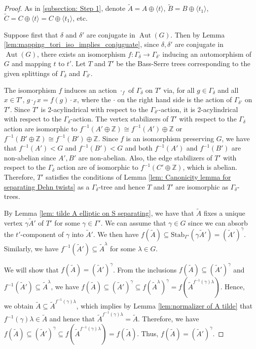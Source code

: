 \documentclass{amsart}
\newcommand{\Z}{\mathbb{Z}}
\DeclareMathOperator{\Aut}{Aut}
\theoremstyle{plain}
\theoremstyle{definition}
\theoremstyle{remark}
\begin{document}
\begin{proof}
    As in \ref{subsection: Step 1}, denote $\tilde{A} = A \oplus \langle t \rangle$, $\tilde{B} = B \oplus \langle t_1 \rangle$, $\tilde{C} = C \oplus \langle t \rangle = C \oplus \langle t_1 \rangle$, etc. 
    
    Suppose first that $\delta$ and $\delta'$ are conjugate in $\Aut(G)$. Then by Lemma \ref{lem:mapping_tori_iso_implies_conjuguate}, since $\delta, \delta'$ are conjugate in $\Aut(G)$, there exists an isomorphism $f: \Gamma_{\delta} \to \Gamma_{\delta'}$ inducing an automorphism of $G$ and mapping $t$ to $t'$. Let $T$ and $T'$ be the Bass-Serre trees corresponding to the given splittings of $\Gamma_{\delta}$ and $\Gamma_{\delta'}$.

     The isomorphism $f$ induces an action $\cdot_f$ of $\Gamma_{\delta}$ on $T'$ via, for all $g \in \Gamma_{\delta}$ and all $x \in T'$, $g \cdot_f x = f(g) \cdot x$, where the $\cdot$ on the right hand side is the action of $\Gamma_{\delta'}$ on $T'$. Since $T'$ is 2-acylindrical with respect to the $\Gamma_{\delta'}$-action, it is 2-acylindrical with respect to the $\Gamma_{\delta}$-action. The vertex stabilizers of $T'$ with respect to the $\Gamma_{\delta}$ action are isomorphic to $f^{-1}(A' \oplus \Z) \cong f^{-1}(A') \oplus \Z$ or $f^{-1}(B' \oplus \Z) \cong f^{-1}(B') \oplus \Z$. Since $f$ is an isomorphism preserving $G$, we have that $f^{-1}(A') < G$ and $f^{-1}(B') < G$ and both $f^{-1}(A')$ and $f^{-1}(B')$ are non-abelian since $A',B'$ are non-abelian. Also, the edge stabilizers of $T'$ with respect to the $\Gamma_{\delta}$ action are of isomorphic to $f^{-1}(C' \oplus \Z)$, which is abelian. Therefore, $T'$ satisfies the conditions of Lemma \ref{lem: Canonicity lemma for separating Dehn twists} as a $\Gamma_{\delta}$-tree and hence $T$ and $T'$ are isomorphic as $\Gamma_{\delta}$-trees. 
     
     By Lemma \ref{lem: tilde A elliptic on S separating}, we have that $\tilde{A}$ fixes a unique vertex $\gamma \tilde{A}'$ of $T'$ for some $\gamma \in \Gamma'$. We can assume that $\gamma \in G$ since we can absorb the $t'$-component of $\gamma$ into $\tilde{A}'$. We then have $f(\tilde{A}) \subseteq \mathrm{Stab}_{\Gamma'}(\gamma \tilde{A}') = (\tilde{A}')^{\gamma}$. Similarly, we have $f^{-1}(\tilde{A}') \subseteq \tilde{A}^{\lambda}$ for some $\lambda \in G$.
     
     We will show that $f(\tilde{A}) = (\tilde{A}')^{\gamma}$. From the inclusions $f(\tilde{A}) \subseteq (\tilde{A}')^{\gamma}$ and $f^{-1}(\tilde{A}') \subseteq \tilde{A}^{\lambda}$, we have $f(\tilde{A}) \subseteq (\tilde{A}')^{\gamma} \subseteq f(\tilde{A}^{\lambda})^{\gamma} = f(\tilde{A}^{f^{-1}(\gamma)\lambda})$. Hence, we obtain $\tilde{A} \subseteq \tilde{A}^{f^{-1}(\gamma) \lambda }$, which implies by Lemma \ref{lem:normalizer of A tilde} that $f^{-1}(\gamma) \lambda \in \tilde{A}$ and hence that $\tilde{A}^{f^{-1}(\gamma) \lambda } = \tilde{A}$. Therefore, we have $f(\tilde{A}) \subseteq (\tilde{A}')^{\gamma} \subseteq f(\tilde{A}^{f^{-1}(\gamma)\lambda}) = f(\tilde{A})$. Thus, $f(\tilde{A}) = (\tilde{A}')^{\gamma}$.


\end{proof}
\end{document}
